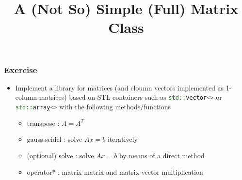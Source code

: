 \documentclass[smaller,a4paper,allowframebreaks]{beamer}
\begin{document}
\title{A (Not So) Simple (Full) Matrix Class}
\frame{\titlepage}

\begin{frame}
\frametitle{Exercise}

\begin{itemize}
\item Implement a
      library for matrices (and cloumn vectors 
      implemented as 1-column matrices) based on 
      STL containers such as \lstinline[language=C++]{std::vector<>}
      or \lstinline[language=C++]{std::array<>}
      with the following methods/functions
      \begin{itemize}
      \item transpose : $A = A^{T}$
      \item gauss-seidel : solve $A x = b$ iteratively 
      \item (optional) solve : solve $A x = b$ by means of a direct
                    method
      \item operator* : matrix-matrix and matrix-vector
                        multiplication
      \end{itemize}      
\end{itemize}
\end{frame}
\end{document}

